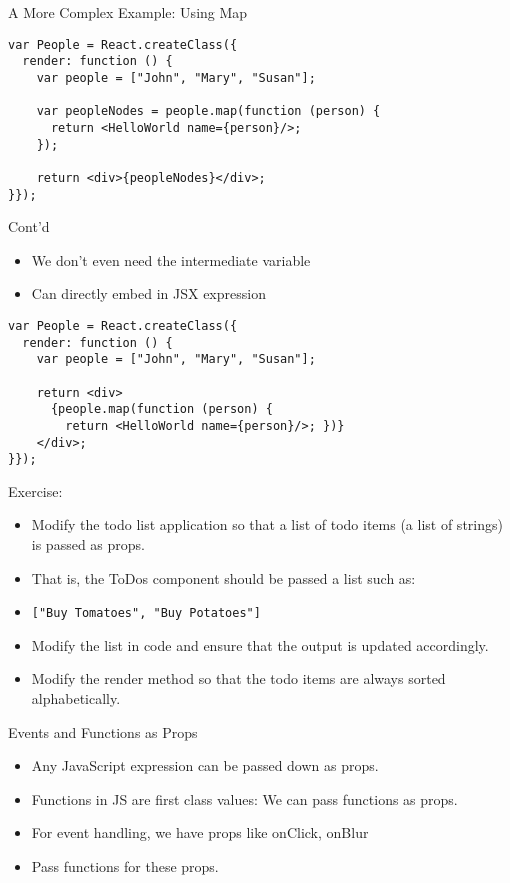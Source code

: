 \documentclass[presentation]{beamer}
\begin{document}
\begin{frame}[fragile,label=sec-4]{A More Complex Example: Using Map}
 \begin{verbatim}
var People = React.createClass({
  render: function () {
    var people = ["John", "Mary", "Susan"];

    var peopleNodes = people.map(function (person) {
      return <HelloWorld name={person}/>;
    });

    return <div>{peopleNodes}</div>;
}});
\end{verbatim}
\end{frame}

\begin{frame}[fragile,label=sec-5]{Cont'd}
 \begin{itemize}
\item We don't even need the intermediate variable
\item Can directly embed in JSX expression
\end{itemize}

\begin{verbatim}
var People = React.createClass({
  render: function () {
    var people = ["John", "Mary", "Susan"];

    return <div>
      {people.map(function (person) {
        return <HelloWorld name={person}/>; })}
    </div>;
}});
\end{verbatim}
\end{frame}

\begin{frame}[fragile,label=sec-6]{Exercise:}
 \begin{itemize}
\item Modify the todo list application so that a list of todo items (a list of
strings) is passed as props.
\item That is, the ToDos component should be passed a list such as:
\item \texttt{["Buy Tomatoes", "Buy Potatoes"]}
\item Modify the list in code and ensure that the output is updated accordingly.
\item Modify the render method so that the todo items are always sorted
alphabetically.
\end{itemize}
\end{frame}

\begin{frame}[label=sec-7]{Events and Functions as Props}
\begin{itemize}
\item Any JavaScript expression can be passed down as props.
\item Functions in JS are first class values: We can pass functions as props.
\item For event handling, we have props like onClick, onBlur
\item Pass functions for these props.
\end{itemize}
\end{frame}
\end{document}
